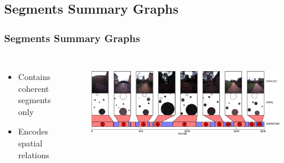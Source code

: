 \subsection{Segments Summary Graphs}
\frame
{
	\frametitle{Segments Summary Graphs}
	\begin{columns}[T]
		\begin{itemize}
			\item Contains coherent segments only
			\item Encodes spatial relations
		\end{itemize}
		\begin{figure}[p]
			\centering
			\includegraphics[width = 1.0\textwidth]{img/icsc/detected_places_nc.eps}
			\label{fig:ssg2}
		\end{figure}
	\end{columns}
	
}